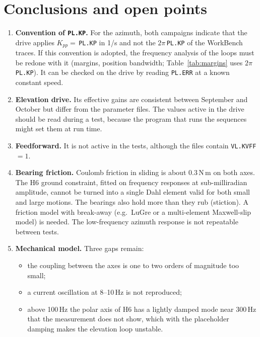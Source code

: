\documentclass[10pt,a4paper]{article}
\numberwithin{equation}{section}
\begin{document}
\section{Conclusions and open points}\label{sec:concl}
\begin{enumerate}
\item \textbf{Convention of \texttt{PL.KP}.} For the azimuth, both campaigns indicate that the drive applies $K_{pp}=$\,\texttt{PL.KP} in 1/s and not the $2\pi$\,\texttt{PL.KP} of the WorkBench traces. If this convention is adopted, the frequency analysis of the loops must be redone with it (margins, position bandwidth; Table~\ref{tab:margins} uses $2\pi$\,\texttt{PL.KP}). It can be checked on the drive by reading \texttt{PL.ERR} at a known constant speed.
\item \textbf{Elevation drive.} Its effective gains are consistent between September and October but differ from the parameter files. The values active in the drive should be read during a test, because the program that runs the sequences might set them at run time.
\item \textbf{Feedforward.} It is not active in the tests, although the files contain \texttt{VL.KVFF} $=1$.
\item \textbf{Bearing friction.} Coulomb friction in sliding is about 0.3\,N\,m on both axes. The H6 ground constraint, fitted on frequency responses at sub-milliradian amplitude, cannot be turned into a single Dahl element valid for both small and large motions. The bearings also hold more than they rub (stiction). A friction model with break-away (e.g.\ LuGre or a multi-element Maxwell-slip model) is needed. The low-frequency azimuth response is not repeatable between tests.
\item \textbf{Mechanical model.} Three gaps remain:
  \begin{itemize}
  \item the coupling between the axes is one to two orders of magnitude too small;
  \item a current oscillation at 8--10\,Hz is not reproduced;
  \item above 100\,Hz the polar axis of H6 has a lightly damped mode near 300\,Hz that the measurement does not show, which with the placeholder damping makes the elevation loop unstable.
  \end{itemize}
\end{enumerate}

\appendix
\end{document}
